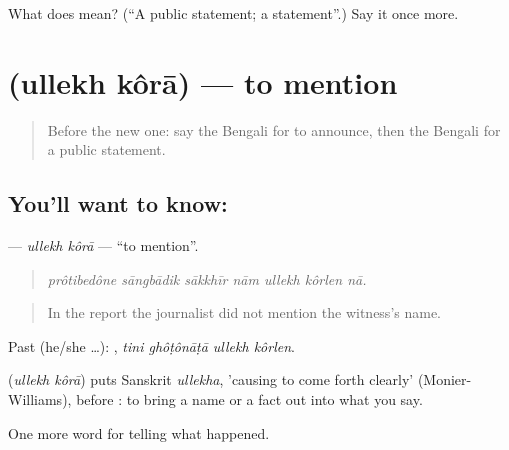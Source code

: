 \begin{tcolorbox}[breakable,colback=teal!4,colframe=teal!35!black,title={Before you move on}]
What does  mean? (\textquotedblleft{}A public statement; a statement\textquotedblright{}.) Say it once more.
\end{tcolorbox}
\section[\texorpdfstring{\bn{উল্লেখ} \bn{করা} (ullekh kôrā)}{উল্লেখ করা (ullekh kôrā)}]{  (ullekh kôrā) — to mention}

\label{lesson:BN-C297-ullekh-kora}



\begin{quote}
Before the new one: say the Bengali for to announce, then the Bengali for a public statement.
\end{quote}

\subsection*{You'll want to know:  }
\textbf{ } — \emph{ullekh kôrā} — \textquotedblleft{}to mention\textquotedblright{}.

\begin{quote}
      
\end{quote}

\begin{quote}
\emph{prôtibedône sāngbādik sākkhīr nām ullekh kôrlen nā.}
\end{quote}

\begin{quote}
In the report the journalist did not mention the witness's name.
\end{quote}

Past (he/she …):    , \emph{tini ghôṭônāṭā ullekh kôrlen}.

\begin{cousinweb}
\textbf{ } (\emph{ullekh kôrā}) puts Sanskrit \emph{ullekha}, 'causing to come forth clearly' (Monier-Williams), before : to bring a name or a fact out into what you say.
\end{cousinweb}

\begin{grammarlens}[title={What you've built}]
One more word for telling what happened.
\end{grammarlens}

